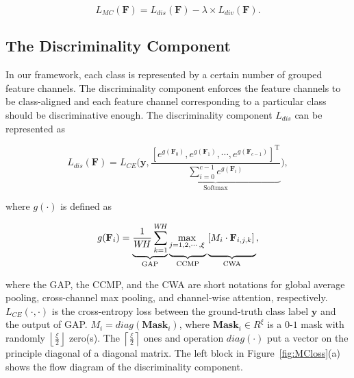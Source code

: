 \documentclass[journal]{IEEEtran}
\begin{document}
\begin{equation}
  L_{MC}(\mathbf{F})={L}_{dis}(\mathbf{F})-\lambda\times{L}_{div}(\mathbf{F}).
    \label{mcloss}
\end{equation}





\subsection{The Discriminality Component}

In our framework, each class is represented by a certain number of grouped feature channels.
The discriminality component enforces the feature channels to be class-aligned and each feature channel corresponding to a particular class should be discriminative enough. The discriminality component $L_{dis}$ can be represented as

\begin{small}
  \begin{equation}\label{eq:L_dis}
    {L}_{dis}(\mathbf{F})={L}_{CE}\big(\boldsymbol{y},\underbrace{\frac{{\left[e^{g(\mathbf{F}_0)}, e^{g(\mathbf{F}_1)}, \cdots, e^{g(\mathbf{F}_{c-1})}\right]^{\text{T}}}} {\sum_{i=0}^{c-1}e^{g(\mathbf{F}_i)}}}_{\text{Softmax}}\big),
  \end{equation}
\end{small}

\noindent where $g(\cdot)$ is defined as

\begin{small}
  \begin{equation}
    g(\mathbf{F}_i)=\underbrace{\frac{1}{W\!H}\sum_{k=1}^{W\!H}}_{\text{GAP}} \underbrace{\max_{j=1,2,\cdots,\xi}\vphantom{\sum_{n=1}^{N}}}_{\text{CCMP}} \underbrace{\left[M_i\cdot\mathbf{F}_{i,j,k}\right]\vphantom{\sum_{n=1}^{N}}}_{\text{CWA}},
  \end{equation}
\end{small}

\noindent where the GAP, the CCMP, and the CWA are short notations for global average pooling, cross-channel max pooling, and channel-wise attention,  respectively. ${L}_{CE}(\cdot, \cdot)$ is the cross-entropy loss between the ground-truth class label $\boldsymbol{y}$ and the output of GAP. $M_i=diag(\textbf{Mask}_i)$, where $\textbf{Mask}_i\in R^{\xi}$ is a $0$-$1$ mask with randomly $\left\lfloor\frac{\xi}{2}\right\rfloor$ zero(s). The  $\left\lceil\frac{\xi}{2}\right\rceil$ ones and operation $diag(\cdot)$ put a vector on the principle diagonal of a diagonal matrix. The left block in Figure~\ref{fig:MCloss}(a) shows the flow diagram of the discriminality component.
\end{document}
